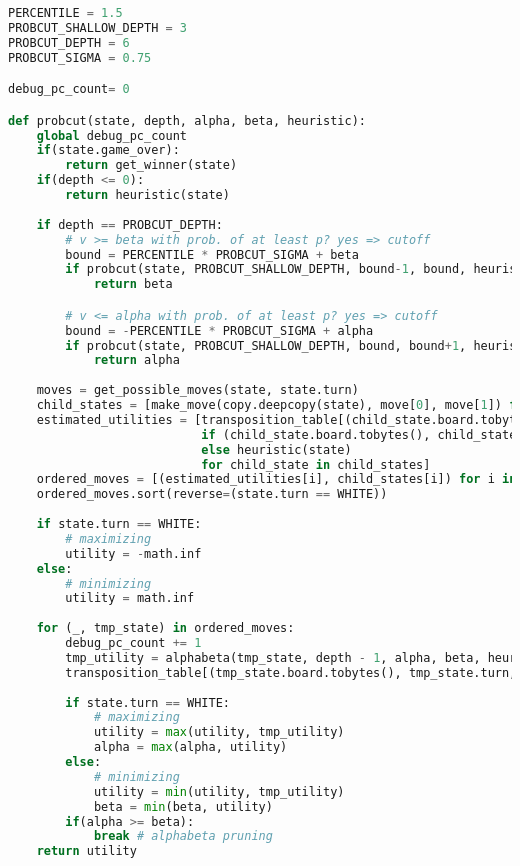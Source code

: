 \begin{lstlisting}[language=Python]
PERCENTILE = 1.5
PROBCUT_SHALLOW_DEPTH = 3
PROBCUT_DEPTH = 6
PROBCUT_SIGMA = 0.75

debug_pc_count= 0

def probcut(state, depth, alpha, beta, heuristic):
    global debug_pc_count
    if(state.game_over):
        return get_winner(state)
    if(depth <= 0):
        return heuristic(state)
    
    if depth == PROBCUT_DEPTH:
        # v >= beta with prob. of at least p? yes => cutoff
        bound = PERCENTILE * PROBCUT_SIGMA + beta
        if probcut(state, PROBCUT_SHALLOW_DEPTH, bound-1, bound, heuristic) >= bound:
            return beta

        # v <= alpha with prob. of at least p? yes => cutoff
        bound = -PERCENTILE * PROBCUT_SIGMA + alpha
        if probcut(state, PROBCUT_SHALLOW_DEPTH, bound, bound+1, heuristic) <= bound:
            return alpha
    
    moves = get_possible_moves(state, state.turn)
    child_states = [make_move(copy.deepcopy(state), move[0], move[1]) for move in moves]
    estimated_utilities = [transposition_table[(child_state.board.tobytes(), child_state.turn, heuristic)]
                           if (child_state.board.tobytes(), child_state.turn, heuristic) in transposition_table
                           else heuristic(state)
                           for child_state in child_states]
    ordered_moves = [(estimated_utilities[i], child_states[i]) for i in range(len(moves))]
    ordered_moves.sort(reverse=(state.turn == WHITE))
    
    if state.turn == WHITE:
        # maximizing
        utility = -math.inf
    else:
        # minimizing
        utility = math.inf
        
    for (_, tmp_state) in ordered_moves:
        debug_pc_count += 1
        tmp_utility = alphabeta(tmp_state, depth - 1, alpha, beta, heuristic)
        transposition_table[(tmp_state.board.tobytes(), tmp_state.turn, heuristic)] = tmp_utility
        
        if state.turn == WHITE:
            # maximizing
            utility = max(utility, tmp_utility)
            alpha = max(alpha, utility)
        else:
            # minimizing
            utility = min(utility, tmp_utility)
            beta = min(beta, utility)
        if(alpha >= beta):
            break # alphabeta pruning
    return utility
\end{lstlisting}

